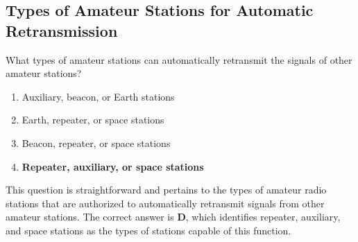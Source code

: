 \subsection{Types of Amateur Stations for Automatic Retransmission}
\label{T1D07}

\begin{tcolorbox}[colback=gray!10!white,colframe=black!75!black,title=T1D07]
What types of amateur stations can automatically retransmit the signals of other amateur stations?
\begin{enumerate}[label=\Alph*),noitemsep]
    \item Auxiliary, beacon, or Earth stations
    \item Earth, repeater, or space stations
    \item Beacon, repeater, or space stations
    \item \textbf{Repeater, auxiliary, or space stations}
\end{enumerate}
\end{tcolorbox}

This question is straightforward and pertains to the types of amateur radio stations that are authorized to automatically retransmit signals from other amateur stations. The correct answer is \textbf{D}, which identifies repeater, auxiliary, and space stations as the types of stations capable of this function.